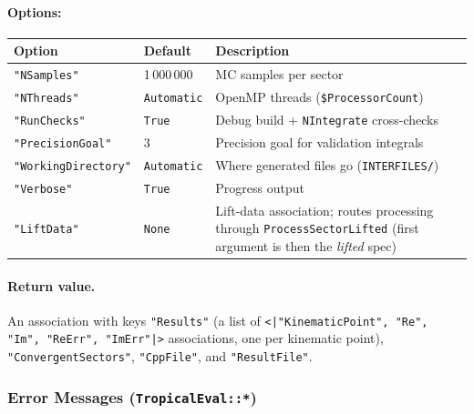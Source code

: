 \documentclass[11pt,a4paper]{article}
\begin{document}
\paragraph{Options:}
\begin{center}
\begin{tabular}{llp{6.2cm}}
\toprule
\textbf{Option} & \textbf{Default} & \textbf{Description} \\
\midrule
\texttt{"NSamples"} & 1\,000\,000 & MC samples per sector \\
\texttt{"NThreads"} & \texttt{Automatic} & OpenMP threads (\texttt{\$ProcessorCount}) \\
\texttt{"RunChecks"} & \texttt{True} & Debug build + \texttt{NIntegrate} cross-checks \\
\texttt{"PrecisionGoal"} & 3 & Precision goal for validation integrals \\
\texttt{"WorkingDirectory"} & \texttt{Automatic} & Where generated files go (\texttt{INTERFILES/}) \\
\texttt{"Verbose"} & \texttt{True} & Progress output \\
\texttt{"LiftData"} & \texttt{None} & Lift-data association; routes processing through \texttt{ProcessSectorLifted} (first argument is then the \emph{lifted} spec) \\
\bottomrule
\end{tabular}
\end{center}

\paragraph{Return value.} An association with keys \texttt{"Results"} (a list of \texttt{<|"KinematicPoint", "Re", "Im", "ReErr", "ImErr"|>} associations, one per kinematic point), \texttt{"ConvergentSectors"}, \texttt{"CppFile"}, and \texttt{"ResultFile"}.

\subsubsection{Error Messages (\texttt{TropicalEval::*})}
\end{document}
